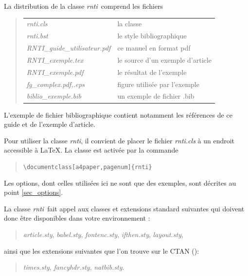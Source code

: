 \documentclass[a4paper,pagenum,hyperref]{rnti}
\makeatletter
\newcommand{\File}[1]{\textit{#1}\index{#1@\textit{#1}}}
\newcommand\rnti{\textit{rnti}}
\makeatother
\begin{document}
La distribution de la classe \rnti\ comprend les fichiers
 \begin{quote}
 \begin{tabular}{ll}
    \File{rnti.cls}   &  la classe \\
    \File{rnti.bst}   &  le style bibliographique\\
    \File{RNTI\_guide\_utilisateur.pdf}   &  ce manuel en format pdf\\
    \File{RNTI\_exemple.tex}  & le source d'un exemple d'article\\
    \File{RNTI\_exemple.pdf}  & le r\'{e}sultat de l'exemple\\
    \File{fg\_complex.pdf,.eps}     & figure utilis\'{e}e par l'exemple\\
    \File{biblio\_exemple.bib} & un exemple de fichier .bib\\
 \end{tabular}
 \end{quote}
L'exemple de fichier bibliographique contient notamment les
r\'{e}f\'{e}rences de ce guide et de l'exemple d'article.


Pour utiliser la classe \rnti, il convient de placer le fichier
\File{rnti.cls} \`{a} un endroit accessible \`{a} \LaTeX. La classe est
activ\'{e}e par la commande
%
 \begin{quote}
  \verb|\documentclass[a4paper,pagenum]{rnti}|
 \end{quote}
%
Les options, dont celles utilis\'{e}es ici ne sont que des exemples,
sont d\'{e}crites au point \ref{sec_options}.

La classe \rnti\ fait appel aux classes et extensions standard
suivantes qui doivent donc \^{e}tre disponibles dans votre environnement
\LaTeXe:
%
 \begin{quote}
        \textit{article.sty},
        \textit{babel.sty},
        \textit{fontenc.sty},
        \textit{ifthen.sty},
        \textit{layout.sty},
 \end{quote}
%
ainsi que les extensions suivantes que l'on trouve sur le
CTAN
(\href{http://www.ctan.org}{}):
%
 \begin{quote}
    \textit{times.sty},
    \textit{fancyhdr.sty},
    \textit{natbib.sty}.
 \end{quote}
\end{document}
